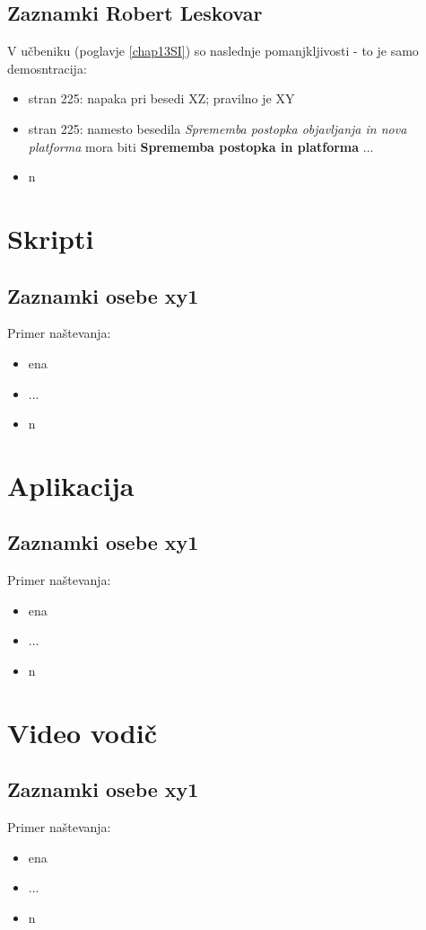 \subsection{Zaznamki Robert Leskovar}
V učbeniku (poglavje \ref{chap13SI}) so naslednje pomanjkljivosti - to je samo demosntracija:
\begin{itemize}
	\item stran 225: napaka pri besedi XZ; pravilno je XY
	\item stran 225: namesto besedila \textit{Sprememba postopka objavljanja in nova platforma } mora biti \textbf{Sprememba postopka in platforma }...
	\item n	
\end{itemize}

\section{Skripti}
\subsection{Zaznamki osebe xy1}
Primer naštevanja:
\begin{itemize}
	\item ena
	\item ...
	\item n	
\end{itemize}

\section{Aplikacija}
\subsection{Zaznamki osebe xy1}
Primer naštevanja:
\begin{itemize}
	\item ena
	\item ...
	\item n	
\end{itemize}

\section{Video vodič}
\subsection{Zaznamki osebe xy1}
Primer naštevanja:
\begin{itemize}
	\item ena
	\item ...
	\item n	
\end{itemize}